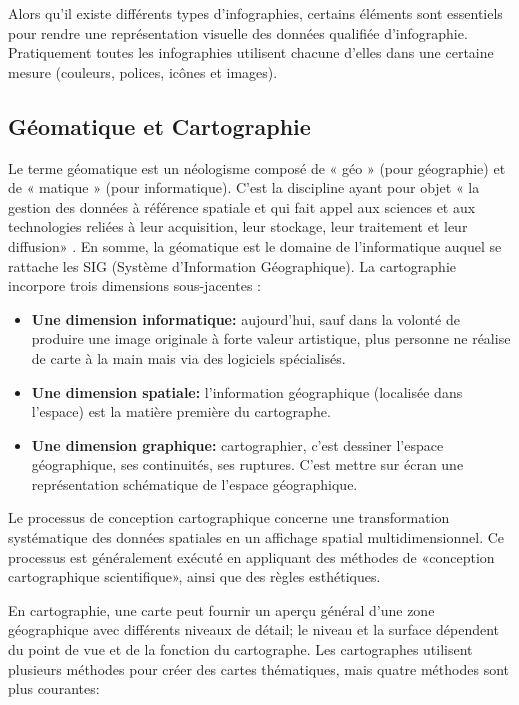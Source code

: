 \documentclass[french, a4paper, 12pt]{report}
\begin{document}
Alors qu'il existe différents types d'infographies, certains éléments sont essentiels pour rendre une représentation visuelle des données qualifiée d'infographie. Pratiquement toutes les infographies utilisent chacune d’elles dans une certaine mesure (couleurs, polices, icônes et images).
\subsection{Géomatique et Cartographie}
Le terme géomatique est un néologisme composé de « géo » (pour géographie) et de « matique » (pour informatique). C’est la discipline ayant pour objet « la gestion des données à référence spatiale et qui fait appel aux sciences et aux technologies reliées à leur acquisition, leur stockage, leur traitement et leur diffusion» \cite{11}. En somme, la géomatique est le domaine de l’informatique auquel se rattache les SIG (Système d’Information Géographique). La cartographie incorpore trois dimensions sous-jacentes \cite{11}:

\begin{itemize}
\item \textbf{Une dimension informatique:}  aujourd’hui, sauf dans la volonté de produire une image originale à forte valeur artistique, plus personne ne réalise de carte à la main mais via des logiciels spécialisés. 
\item \textbf{Une dimension spatiale:}  l’information géographique (localisée dans l’espace) est la matière première du cartographe. 
\item \textbf{ Une dimension graphique:} cartographier, c’est dessiner l’espace géographique, ses continuités, ses ruptures. C’est mettre sur écran une représentation schématique de l’espace géographique.
\end{itemize} 
Le processus de conception cartographique concerne une transformation systématique des données spatiales en un affichage spatial multidimensionnel. Ce processus est généralement exécuté en appliquant des méthodes de «conception cartographique scientifique», ainsi que des règles esthétiques.

En cartographie, une carte peut fournir un aperçu général d’une zone géographique avec différents niveaux de détail; le niveau et la surface dépendent du point de vue et de la fonction du cartographe. Les cartographes utilisent plusieurs méthodes pour créer des cartes thématiques, mais quatre méthodes sont plus courantes:
\end{document}
